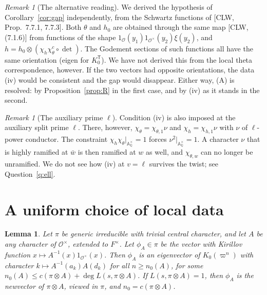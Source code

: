 \documentclass[11pt]{amsart}
\newtheorem{lemma}[theorem]{Lemma}
\theoremstyle{definition}
\theoremstyle{remark}
\newtheorem{remark}[theorem]{Remark}
\newcommand{\Q}{\mathbb{Q}}
\newcommand{\cO}{\mathcal{O}}
\newcommand{\vp}{\varpi}
\begin{document}
\begin{remark}[The alternative reading]\label{rem:L2}
We derived the hypothesis of Corollary~\ref{cor:gap} independently, from the Schwartz functions of [CLW, Prop.~7.7.1, 7.7.3]. Both $\theta$ and $h_0$ are obtained through the same map [CLW, (7.1.6)] from functions of the shape $1_{\cO}(y_1)1_{\cO^\times}(y_2)\xi(y_2)$, and $h=h_0\otimes(\chi_h\chi_\theta^c\circ\det)$. The Godement sections of such functions all have the same orientation (eigen for $K_0^{\mathsf T}$). We have not derived this from the local theta correspondence, however. If the two vectors had opposite orientations, the data (iv) would be consistent and the gap would disappear. Either way, (A) is resolved: by Proposition~\ref{prop:R} in the first case, and by (iv) as it stands in the second.
\end{remark}

\begin{remark}[The auxiliary prime $\ell$]\label{rem:ell}
Condition (iv) is also imposed at the auxiliary split prime $\ell$. There, however, $\chi_\theta=\chi_{\theta,1}\nu$ and $\chi_h=\chi_{h,1}\nu$ with $\nu$ of $\ell$-power conductor. The constraint $\chi_h\chi_\theta|_{\mathbb A_\Q^\times}=1$ forces $\nu^2|_{\mathbb A_\Q^\times}=1$. A character $\nu$ that is highly ramified at $\bar w$ is then ramified at $w$ as well, and $\chi_{\theta,w}$ can no longer be unramified. We do not see how (iv) at $v=\ell$ survives the twist; see Question~\ref{q:ell}.
\end{remark}

\section{A uniform choice of local data}\label{sec:R}

\begin{lemma}\label{lem:phiA}
Let $\pi$ be generic irreducible with trivial central character, and let $A$ be any character of $\cO^\times$, extended to $F^\times$. Let $\phi_A\in\pi$ be the vector with Kirillov function $x\mapsto A^{-1}(x)1_{\cO^\times}(x)$. Then $\phi_A$ is an eigenvector of $K_0(\vp^n)$ with character $k\mapsto A^{-1}(a_k)A(d_k)$ for all $n\ge n_0(A)$, for some $n_0(A)\le c(\pi\otimes A)+\deg L(s,\pi\otimes A)$. If $L(s,\pi\otimes A)=1$, then $\phi_A$ is the newvector of $\pi\otimes A$, viewed in $\pi$, and $n_0=c(\pi\otimes A)$.
\end{lemma}
\end{document}
